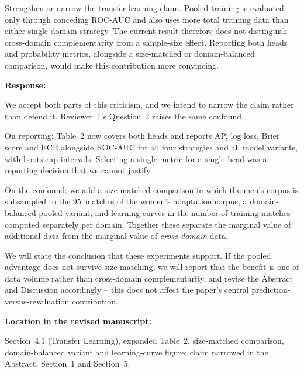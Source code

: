 \documentclass[11pt,a4paper]{article}
\newcommand{\pending}[1]{\textcolor{statuspending}{#1}}
\newcommand{\response}[2]{%
  \begin{responsebox}
  \textbf{Response:}

  #1
  \end{responsebox}
  \begin{locationbox}
  \textbf{Location in the revised manuscript:}

  #2
  \end{locationbox}
}
\begin{document}
\begin{reviewbox}[Comment 3]
Strengthen or narrow the transfer-learning claim. Pooled training is evaluated only through conceding ROC-AUC and also uses more total training data than either single-domain strategy. The current result therefore does not distinguish cross-domain complementarity from a sample-size effect. Reporting both heads and probability metrics, alongside a size-matched or domain-balanced comparison, would make this contribution more convincing.
\end{reviewbox}
\response{We accept both parts of this criticism, and we intend to narrow the claim rather than defend it. Reviewer~1's Question~2 raises the same confound.

\pending{On reporting: Table~2 now covers both heads and reports AP, log loss, Brier score and ECE alongside ROC-AUC for all four strategies and all model variants, with bootstrap intervals. Selecting a single metric for a single head was a reporting decision that we cannot justify.}

\pending{On the confound: we add a size-matched comparison in which the men's corpus is subsampled to the 95~matches of the women's adaptation corpus, a domain-balanced pooled variant, and learning curves in the number of training matches computed separately per domain. Together these separate the marginal value of additional data from the marginal value of \emph{cross-domain} data.}

\pending{We will state the conclusion that these experiments support. If the pooled advantage does not survive size matching, we will report that the benefit is one of data volume rather than cross-domain complementarity, and revise the Abstract and Discussion accordingly -- this does not affect the paper's central prediction-versus-revaluation contribution.}}{Section~4.1 (Transfer Learning), expanded Table~2, size-matched comparison, domain-balanced variant and learning-curve figure; claim narrowed in the Abstract, Section~1 and Section~5.}
\end{document}
